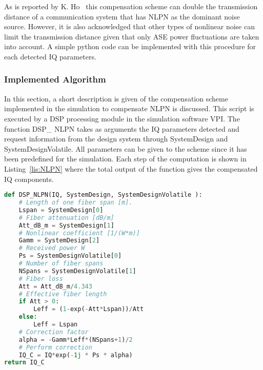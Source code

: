 \begin{figure}[H]
                                                                                                                                                                                                                                                                                                                                                                                                                                                                                                                                                                   
  \label{fig:NLPNvis}
\end{figure}

As is reported by K. Ho~\cite{NLPNDSP} this compensation scheme can double the transmission distance of a communication system that has  NLPN as the dominant noise source. However, it is also acknowledged that other types of nonlinear noise can limit the transmission distance given that only ASE power fluctuations are taken into account. A simple python code can be implemented with this procedure for each detected IQ parameters.

\subsubsection{Implemented Algorithm}

In this section, a short description is given of the compensation scheme implemented in the simulation to compensate NLPN is discussed. This script is executed by a DSP processing module in the simulation software VPI. The function DSP\_ NLPN takes as arguments the IQ parameters detected and request information from the design system through SystemDesign and SystemDesignVolatile. All parameters can be given to the scheme since it has been predefined for the simulation. Each step of the computation is shown in Listing~\ref{lis:NLPN} where the total output of the function gives the compensated IQ components. ~\\
 
\begin{lstlisting}[language=Python, caption= 	Python implementation of an analytically derived compensation scheme to mitigate NLPN. The scheme requires the current state of the system given by user input. ,label=lis:NLPN]
def DSP_NLPN(IQ, SystemDesign, SystemDesignVolatile ):
	# Length of one fiber span [m].
	Lspan = SystemDesign[0]
	# Fiber attenuation [dB/m]
	Att_dB_m = SystemDesign[1]
	# Nonlinear coefficient [1/(W*m)]
	Gamm = SystemDesign[2]
	# Received power W
	Ps = SystemDesignVolatile[0]
	# Number of fiber spans
	NSpans = SystemDesignVolatile[1]
	# Fiber loss
	Att = Att_dB_m/4.343
	# Effective fiber length
	if Att > 0:
		Leff = (1-exp(-Att*Lspan))/Att
	else:
		Leff = Lspan
	# Correction factor
	alpha = -Gamm*Leff*(NSpans+1)/2
	# Perform correction
	IQ_C = IQ*exp(-1j * Ps * alpha)
return IQ_C
\end{lstlisting}

